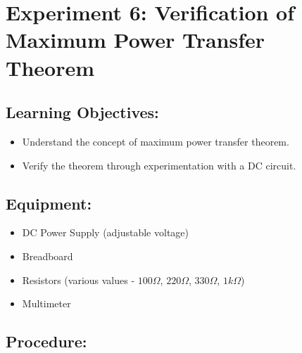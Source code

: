\section*{Experiment 6: Verification of Maximum Power Transfer Theorem}  

\subsection*{Learning Objectives:}
\begin{itemize}
    \item Understand the concept of maximum power transfer theorem.
    \item Verify the theorem through experimentation with a DC circuit.
\end{itemize}

\subsection*{Equipment:}
\begin{itemize}
    \item DC Power Supply (adjustable voltage)
    \item Breadboard
    \item Resistors (various values - $100 \Omega$, $220 \Omega$, $330 \Omega$, $1k\Omega$)
    \item Multimeter
\end{itemize}

\subsection*{Procedure:}

